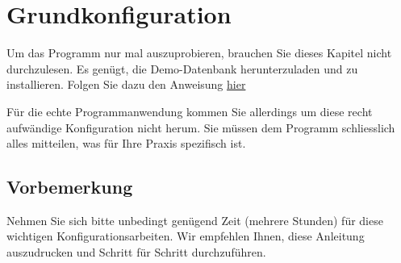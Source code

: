 %


\section{Grundkonfiguration}
Um das Programm nur mal auszuprobieren, brauchen Sie dieses Kapitel nicht durchzulesen. Es genügt, die Demo-Datenbank herunterzuladen und zu installieren. Folgen Sie dazu den Anweisung \href{http://www.elexis.ch/jp/index.php?option=content&task=view&id=71}{hier}

Für die echte Programmanwendung kommen Sie allerdings um diese recht aufwändige Konfiguration nicht herum. Sie müssen dem Programm schliesslich alles mitteilen, was für Ihre Praxis spezifisch ist.

\subsection{Vorbemerkung}
Nehmen Sie sich bitte unbedingt genügend Zeit (mehrere Stunden) für diese wichtigen Konfigurationsarbeiten. Wir empfehlen Ihnen, diese Anleitung auszudrucken und Schritt für Schritt durchzuführen.

